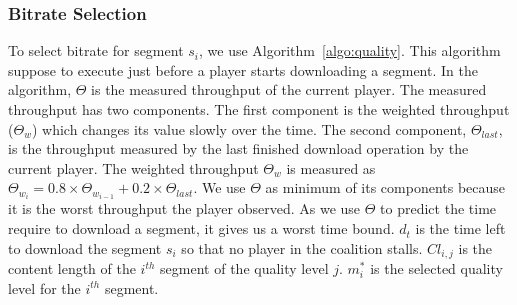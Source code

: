 \subsubsection{Bitrate Selection}
To select bitrate for segment $s_i$, we use Algorithm~\ref{algo:quality}. This algorithm suppose to execute just before a player starts downloading a segment. In the algorithm, $\varTheta$ is the measured throughput of the current player. The measured throughput has two components. The first component is the weighted throughput ($\varTheta_w$) which changes its value slowly over the time. The second component, $\varTheta_{last}$, is the throughput measured by the last finished download operation by the current player. The weighted throughput $\varTheta_{w}$ is measured as $\varTheta_{w_i} = 0.8 \times \varTheta_{w_{i-1}} + 0.2 \times \varTheta_{last}$. We use $\varTheta$ as minimum of its components because it is the worst throughput the player observed. As we use $\varTheta$ to predict the time require to download a segment, it gives us a worst time bound. $d_t$ is the time left to download the segment $s_i$ so that no player in the coalition stalls. $Cl_{i,j}$ is the content length of the $i^{th}$ segment of the quality level $j$. $m^*_i$ is the selected quality level for the $i^{th}$ segment. 

